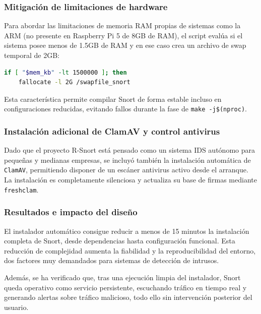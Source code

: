 \documentclass[12pt,a4paper]{report}
\begin{document}
\subsubsection{Mitigación de limitaciones de hardware}

Para abordar las limitaciones de memoria RAM propias de sistemas como la ARM (no presente en Raspberry Pi 5 de 8GB de RAM), el script evalúa si el sistema posee menos de 1.5GB de RAM y en ese caso crea un archivo de swap temporal de 2GB:

\begin{lstlisting}[language=bash]
	if [ "$mem_kb" -lt 1500000 ]; then
	fallocate -l 2G /swapfile_snort
\end{lstlisting}

Esta característica permite compilar Snort de forma estable incluso en configuraciones reducidas, evitando fallos durante la fase de \texttt{make -j\$(nproc)}.

\subsubsection{Instalación adicional de ClamAV y control antivirus}

Dado que el proyecto R-Snort está pensado como un sistema IDS autónomo para pequeñas y medianas empresas, se incluyó también la instalación automática de \texttt{ClamAV}, permitiendo disponer de un escáner antivirus activo desde el arranque. La instalación es completamente silenciosa y actualiza su base de firmas mediante \texttt{freshclam}.

\subsubsection{Resultados e impacto del diseño}

El instalador automático consigue reducir a menos de 15 minutos la instalación completa de Snort, desde dependencias hasta configuración funcional. Esta reducción de complejidad aumenta la fiabilidad y la reproducibilidad del entorno, dos factores muy demandados para sistemas de detección de intrusos.\newline

Además, se ha verificado que, tras una ejecución limpia del instalador, Snort queda operativo como servicio persistente, escuchando tráfico en tiempo real y generando alertas sobre tráfico malicioso, todo ello sin intervención posterior del usuario.

\pagebreak
\end{document}
